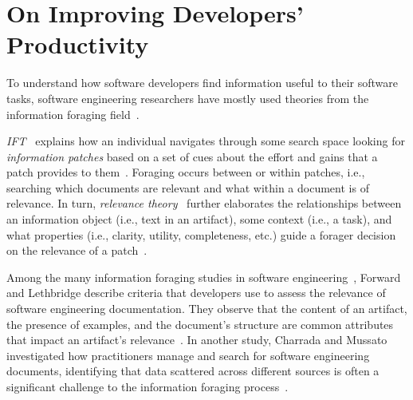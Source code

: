 



\section{On Improving Developers' Productivity}
\label{cp2:dev-productivity}




To understand how software developers find  information useful to their software tasks,
software engineering researchers have mostly used theories from the information foraging
field~\cite{Pirolli1999}. 


\textit{\acf{IFT}}~\cite{Pirolli1999} explains how 
an individual navigates through some search space looking for \textit{information patches} based on 
a set of cues about the effort and gains that a patch provides to them~\cite{Pirolli1999}.
Foraging occurs between or within patches, i.e., 
searching which documents are relevant and what within a document is of relevance.
In turn, \textit{relevance theory}~\cite{clark2013relevance, saracevic1975} further elaborates the relationships between an information object (i.e., text in an artifact),
some context (i.e., a task), and what properties (i.e., clarity, utility, completeness, etc.) guide a forager decision 
on the relevance of a patch~\cite{Saracevic2007b, Saracevic2007c}. 



Among the many information foraging studies in software engineering~\cite{Piorkowski2015, Piorkowski2016, chi2007, Ko2006a},
 Forward and Lethbridge describe criteria that developers use to assess the relevance of software engineering documentation. They observe that the content of an artifact, the presence of examples, and the document's structure are common attributes that impact an artifact's relevance~\cite{Forward2002}.
In another study, Charrada and Mussato investigated how 
practitioners manage and search for software engineering documents, 
identifying that data scattered across different sources is 
often a significant challenge to the information foraging process~\cite{BenCharrada2016}.



